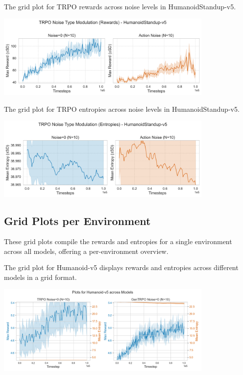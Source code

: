 \documentclass{svproc}
\begin{document}
The grid plot for TRPO rewards across noise levels in HumanoidStandup-v5.

\begin{center}
\includegraphics[width=0.8\textwidth]{graph_HumanoidStandup-v5_TRPO_noise_mod_rewards_grid.png}
\end{center}

The grid plot for TRPO entropies across noise levels in HumanoidStandup-v5.

\begin{center}
\includegraphics[width=0.8\textwidth]{graph_HumanoidStandup-v5_TRPO_noise_mod_entropies_grid.png}
\end{center}

\subsection{Grid Plots per Environment}
These grid plots compile the rewards and entropies for a single environment across all models, offering a per-environment overview.

The grid plot for Humanoid-v5 displays rewards and entropies across different models in a grid format.

\begin{center}
\includegraphics[width=0.8\textwidth]{grid_env_Humanoid-v5.png}
\end{center}
\end{document}
